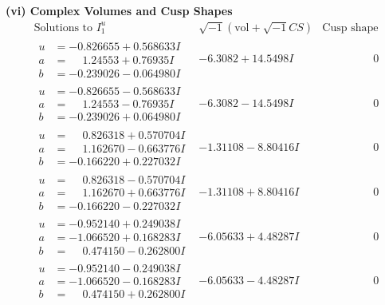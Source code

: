 \documentclass[1p]{elsarticle_modified}
\theoremstyle{definition}
\newcommand{\I}{\sqrt{-1}}
\begin{document}
\newpage\flushleft \textbf{(vi) Complex Volumes and Cusp Shapes}
$$\begin{array}{c|c|c}  
\text{Solutions to }I^u_{1}& \I (\text{vol} + \sqrt{-1}CS) & \text{Cusp shape}\\
 \hline 
\begin{aligned}
u &= -0.826655 + 0.568633 I \\
a &= \phantom{-}1.24553 + 0.76935 I \\
b &= -0.239026 - 0.064980 I\end{aligned}
 & -6.3082 + 14.5498 I & \phantom{-0.000000 } 0 \\ \hline\begin{aligned}
u &= -0.826655 - 0.568633 I \\
a &= \phantom{-}1.24553 - 0.76935 I \\
b &= -0.239026 + 0.064980 I\end{aligned}
 & -6.3082 - 14.5498 I & \phantom{-0.000000 } 0 \\ \hline\begin{aligned}
u &= \phantom{-}0.826318 + 0.570704 I \\
a &= \phantom{-}1.162670 - 0.663776 I \\
b &= -0.166220 + 0.227032 I\end{aligned}
 & -1.31108 - 8.80416 I & \phantom{-0.000000 } 0 \\ \hline\begin{aligned}
u &= \phantom{-}0.826318 - 0.570704 I \\
a &= \phantom{-}1.162670 + 0.663776 I \\
b &= -0.166220 - 0.227032 I\end{aligned}
 & -1.31108 + 8.80416 I & \phantom{-0.000000 } 0 \\ \hline\begin{aligned}
u &= -0.952140 + 0.249038 I \\
a &= -1.066520 + 0.168283 I \\
b &= \phantom{-}0.474150 - 0.262800 I\end{aligned}
 & -6.05633 + 4.48287 I & \phantom{-0.000000 } 0 \\ \hline\begin{aligned}
u &= -0.952140 - 0.249038 I \\
a &= -1.066520 - 0.168283 I \\
b &= \phantom{-}0.474150 + 0.262800 I\end{aligned}
 & -6.05633 - 4.48287 I & \phantom{-0.000000 } 0 \\ \hline\begin{aligned}

\end{aligned}
\end{array}$$
\end{document}

